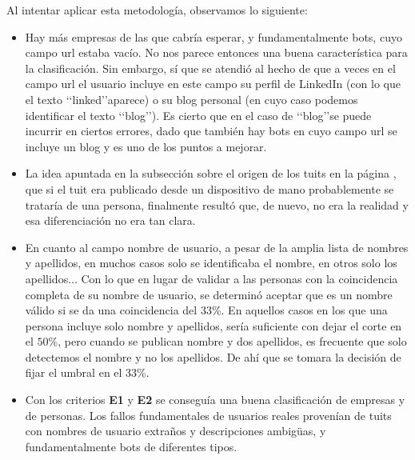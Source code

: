 Al intentar aplicar esta metodología, observamos lo siguiente:
\begin{itemize}
\item Hay más empresas de las que cabría esperar, y fundamentalmente bots, cuyo campo url estaba vacío. No
nos parece entonces una buena característica para la clasificación. Sin embargo, sí que se atendió al hecho 
de que a veces en el campo url el usuario incluye en este campo su perfil de LinkedIn (con lo que el
texto \lq\lq linked\rq\rq aparece) o su blog personal (en cuyo caso podemos identificar el texto 
\lq\lq blog\rq\rq). Es cierto que en el caso de \lq\lq blog\rq\rq se puede incurrir en ciertos errores,
dado que también hay bots en cuyo campo url se incluye un blog y es uno de los puntos a mejorar. 
\item La idea apuntada en la subsección sobre el origen de los tuits en la
página \pageref{subsubsect:origen_tuits}, que si el tuit era publicado desde un dispositivo de mano 
probablemente se trataría de una persona,  finalmente resultó que, de nuevo, no era la realidad y esa
diferenciación no era tan clara. 
\item En cuanto al campo nombre de usuario, a pesar de la amplia lista de nombres y apellidos,
en muchos casos solo se identificaba el nombre, en otros solo los apellidos... Con lo que en lugar de validar a las personas con la coincidencia completa de su nombre de usuario, se determinó 
aceptar que es un nombre válido si se da una coincidencia del $33$\%. En aquellos casos en los que una 
persona incluye solo nombre y apellidos, sería suficiente con dejar el corte en el $50$\%,
pero cuando se publican nombre y dos apellidos,  es frecuente que solo detectemos el nombre y no los apellidos. De ahí que se tomara la decisión de fijar el umbral en el $33$\%.
\item Con los criterios {\bf E1} y {\bf E2} se conseguía una buena clasificación de empresas y de personas. 
Los fallos fundamentales de usuarios reales provenían de tuits con nombres de usuario extraños y descripciones
ambigüas, y fundamentalmente bots de diferentes tipos.
\end{itemize}

